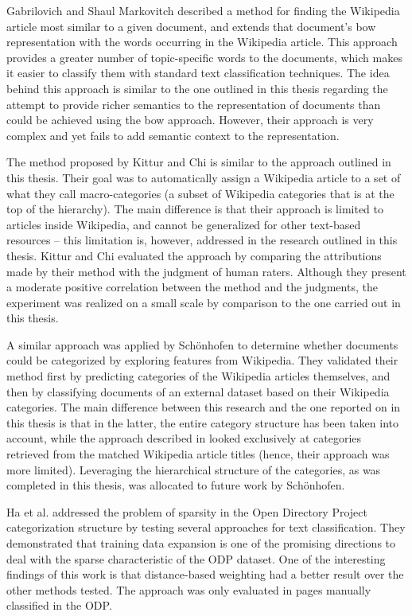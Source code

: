 Gabrilovich and Shaul Markovitch \cite{Gabrilovich:2006} described a method for finding the Wikipedia article most similar to a given document, and extends that document's \gls{bow} representation with the words occurring in the Wikipedia article. This approach provides a greater number of topic-specific words to the documents, which makes it easier to classify them with standard text classification techniques. The idea behind this approach is similar to the one outlined in this thesis regarding the attempt to provide richer semantics to the representation of documents than could be achieved using the \gls{bow} approach. However, their approach is very complex and yet fails to add semantic context to the representation.

The method proposed by Kittur and Chi \cite{kittur2009s} is similar to the approach outlined in this thesis. Their goal was to automatically assign a Wikipedia article to a set of what they call macro-categories (a subset of Wikipedia categories that is at the top of the hierarchy). The main difference is that their approach is limited to articles inside Wikipedia, and cannot be generalized for other text-based resources -- this limitation is, however, addressed in the research outlined in this thesis. Kittur and Chi \cite{kittur2009s} evaluated the approach by comparing the attributions made by their method with the judgment of human raters. Although they present a moderate positive correlation between the method and the judgments, the experiment was realized on a small scale by comparison to the one carried out in this thesis. 

A similar approach was applied by Sch\"onhofen \cite{schonhofen2009identifying} to determine whether documents could be categorized by exploring features from Wikipedia. They validated their method first by predicting categories of the Wikipedia articles themselves, and then by classifying documents of an external dataset based on their Wikipedia categories. The main difference between this research and the one reported on in this thesis is that in the latter, the entire category structure has been taken into account, while the approach described in \cite{schonhofen2009identifying} looked exclusively at categories retrieved from the matched Wikipedia article titles (hence, their approach was more limited). Leveraging the hierarchical structure of the categories, as was completed in this thesis, was allocated to future work by Sch\"onhofen.

Ha et al.  \cite{7058134} addressed the problem of sparsity in the Open Directory Project categorization structure by testing several approaches for text classification. They demonstrated that training data expansion is one of the promising directions to deal with the sparse characteristic of the ODP dataset. 
One of the interesting findings of this work is that distance-based weighting had a better result over the other methods tested. The approach was only evaluated in pages manually classified in the ODP. 


